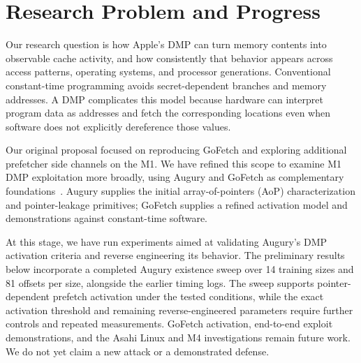 \section{Research Problem and Progress}
Our research question is how Apple's DMP can turn memory contents into observable cache activity, and how consistently that behavior appears across access patterns, operating systems, and processor generations. Conventional constant-time programming avoids secret-dependent branches and memory addresses. A DMP complicates this model because hardware can interpret program data as addresses and fetch the corresponding locations even when software does not explicitly dereference those values.

Our original proposal focused on reproducing GoFetch and exploring additional prefetcher side channels on the M1. We have refined this scope to examine M1 DMP exploitation more broadly, using Augury and GoFetch as complementary foundations~\cite{augury,gofetch}. Augury supplies the initial array-of-pointers (AoP) characterization and pointer-leakage primitives; GoFetch supplies a refined activation model and demonstrations against constant-time software.

At this stage, we have run experiments aimed at validating Augury's DMP activation criteria and reverse engineering its behavior. The preliminary results below incorporate a completed Augury existence sweep over 14 training sizes and 81 offsets per size, alongside the earlier timing logs. The sweep supports pointer-dependent prefetch activation under the tested conditions, while the exact activation threshold and remaining reverse-engineered parameters require further controls and repeated measurements. GoFetch activation, end-to-end exploit demonstrations, and the Asahi Linux and M4 investigations remain future work. We do not yet claim a new attack or a demonstrated defense.
